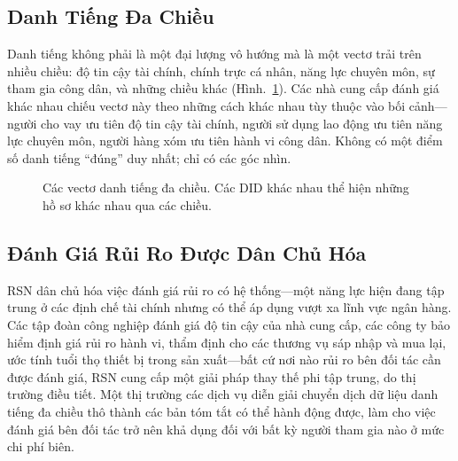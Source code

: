 \documentclass[11pt,a4paper,twocolumn]{article}
\begin{document}
\subsection{Danh Tiếng Đa Chiều}

Danh tiếng không phải là một đại lượng vô hướng mà là một vectơ trải trên nhiều chiều: độ tin cậy tài chính, chính trực cá nhân, năng lực chuyên môn, sự tham gia công dân, và những chiều khác (Hình.~\ref{fig:reputation-radar}). Các nhà cung cấp đánh giá khác nhau chiếu vectơ này theo những cách khác nhau tùy thuộc vào bối cảnh---người cho vay ưu tiên độ tin cậy tài chính, người sử dụng lao động ưu tiên năng lực chuyên môn, người hàng xóm ưu tiên hành vi công dân. Không có một điểm số danh tiếng ``đúng'' duy nhất; chỉ có các góc nhìn.

\begin{figure}[ht]
\centering
{}
\caption{Các vectơ danh tiếng đa chiều. Các DID khác nhau thể hiện những hồ sơ khác nhau qua các chiều.}
\label{fig:reputation-radar}
\end{figure}

\subsection{Đánh Giá Rủi Ro Được Dân Chủ Hóa}

RSN dân chủ hóa việc đánh giá rủi ro có hệ thống---một năng lực hiện đang tập trung ở các định chế tài chính nhưng có thể áp dụng vượt xa lĩnh vực ngân hàng. Các tập đoàn công nghiệp đánh giá độ tin cậy của nhà cung cấp, các công ty bảo hiểm định giá rủi ro hành vi, thẩm định cho các thương vụ sáp nhập và mua lại, ước tính tuổi thọ thiết bị trong sản xuất---bất cứ nơi nào rủi ro bên đối tác cần được đánh giá, RSN cung cấp một giải pháp thay thế phi tập trung, do thị trường điều tiết. Một thị trường các dịch vụ diễn giải chuyển dịch dữ liệu danh tiếng đa chiều thô thành các bản tóm tắt có thể hành động được, làm cho việc đánh giá bên đối tác trở nên khả dụng đối với bất kỳ người tham gia nào ở mức chi phí biên.
\end{document}
